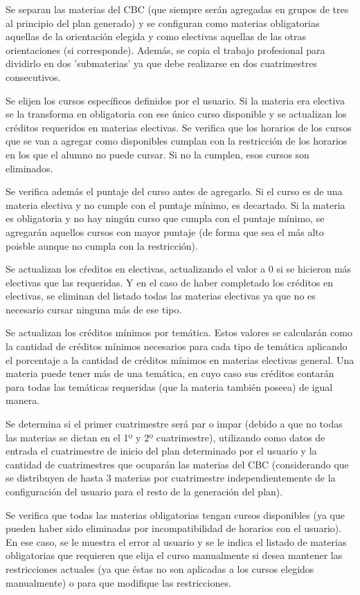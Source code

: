 \documentclass[a4paper]{article}
\begin{document}
Se separan las materias del CBC (que siempre serán agregadas en grupos de tres al principio del plan generado) y se configuran como materias obligatorias aquellas de la orientación elegida y como electivas aquellas de las otras orientaciones (si corresponde). Además, se copia el trabajo profesional para dividirlo en dos 'submaterias' ya que debe realizarse en dos cuatrimestres consecutivos.

Se elijen los cursos específicos definidos por el usuario. Si la materia era electiva se la transforma en obligatoria con ese único curso disponible y se actualizan los créditos requeridos en materias electivas. Se verifica que los horarios de los cursos que se van a agregar como disponibles cumplan con la restricción de los horarios en los que el alumno no puede cursar. Si no la cumplen, esos cursos son eliminados.

Se verifica además el puntaje del curso antes de agregarlo. Si el curso es de una materia electiva y no cumple con el puntaje mínimo, es decartado. Si la materia es obligatoria y no hay ningún curso que cumpla con el puntaje mínimo, se agregarán aquellos cursos con mayor puntaje (de forma que sea el más alto poisble aunque no cumpla con la restricción).

Se actualizan los cŕeditos en electivas, actualizando el valor a 0 si se hicieron más electivas que las requeridas. Y en el caso de haber completado los créditos en electivas, se eliminan del listado todas las materias electivas ya que no es necesario cursar ninguna más de ese tipo.

Se actualizan los créditos mínimos por temática. Estos valores se calcularán como la cantidad de créditos mínimos necesarios para cada tipo de temática aplicando el porcentaje a la cantidad de créditos mínimos en materias electivas general. Una materia puede tener más de una temática, en cuyo caso sus créditos contarán para todas las temáticas requeridas (que la materia también poseea) de igual manera.

Se determina si el primer cuatrimestre será par o impar (debido a que no todas las materias se dictan en el 1º y 2º cuatrimestre), utilizando como datos de entrada el cuatrimestre de inicio del plan determinado por el usuario y la cantidad de cuatrimestres que ocuparán las materias del CBC (considerando que se distribuyen de hasta 3 materias por cuatrimestre independientemente de la configuración del usuario para el resto de la generación del plan).

Se verifica que todas las materias obligatorias tengan cursos disponibles (ya que pueden haber sido eliminadas por incompatibilidad de horarios con el usuario). En ese caso, se le muestra el error al usuario y se le indica el listado de materias obligatorias que requieren que elija el curso manualmente si desea mantener las restricciones actuales (ya que éstas no son aplicadas a los cursos elegidos manualmente) o para que modifique las restricciones.
\end{document}
